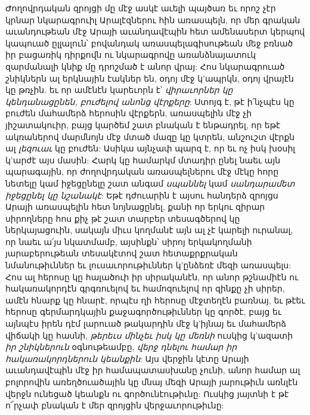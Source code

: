 \documentclass{article}
\begin{document}
{Ժողովրդական զրոյցի մը մէջ ասկէ աւելի պայծառ եւ որոշ չէր կրնար նկարագրուիլ Արալէզներու հին առասպելն, որ մեր գրական աւանդութեան մէջ Արայի աւանդավէպին հետ ամենասերտ կերպով կապուած ըլլալուն՝ բովանդակ առասպելագիսութեան մեջ բռնած իր բացառիկ դիրքովն ու նկարագրովը առանձնայատուկ զարմանալի կնիք մը դրոշմած է անոր վրայ: Հոս նկարագրուած շնիկներն ալ երկնային էակներ են, օդոյ մէջ կ'ապրկն, օդոյ վրայէն կը թռչին. եւ որ ամէնէն կարեւորն է՝ \emph{վիրաւորներ կը կենդանացընեն, բուժելով անոնց վէրքերը}: Ստոյգ է, թէ ի՛նչպէս կը բուժեն մահամերձ հերոսին վէրքերն, առասպելին մէջ չի յիշատակուիր, բայց կարծեմ շատ բնական է ենթադրել, որ եթէ ակռաներով մարմնոյն մէջ մտած մազը կը կտրեն, անշուշտ վէրքն ալ \emph{լեզուաւ} կը բուժեն: Ասիկա այնչափ պարզ է, որ եւ ոչ իսկ խօսիլ կ'արժէ այս մասին: Հարկ կը համարկմ մտադիր ընել նաեւ այն պարագային, որ ժողովրդական առասպելներու մէջ մէկը հորը նետելը կամ իջեցընելը շատ անգամ \emph{սպաննել} կամ \emph{սանդարամետ իջեցընել կը նշանակէ}: Եթէ դժուարին է այսու հանդերձ զրոյցս Արայի առասպելին հետ նոյնացընել, քանի որ երկու զիրար սիրողները հոս քիչ թէ շատ տարբեր տեսագծերով կը ներկայացուին, սակայն միւս կողմանէ այն ալ չէ կարելի ուրանալ, որ նաեւ ա՛յս նկատմամբ, այսինքն՝ սիրոյ երկակողմանի յարաբերութեան տեսակէտով շատ հետաքրքրական նմանութիւններ եւ լուսաւորութիւններ կ'ընձեռէ մեզի առասպելս: Հոս ալ հերոսը կը հալածուի իր սիրականէն, որ անոր թշնամիէն ու հակառակորդէն գրգռուելով եւ համոզուելով որ զինքը չի սիրեր, ամէն հնարք կը հնարէ, որպէս ղի հերոսը մէջտեղէն բառնայ, եւ թէեւ հերոսը գերմարդկային քաջագործութիւններ կը գործէ, բայց եւ այնպէս իրեն դէմ լարուած թակարդին մէջ կ'իյնայ եւ մահամերձ վիճակի կը հասնի, \emph{թերեւս մինչեւ իսկ կը մեռնի} ուսկից կ'ազատի \emph{իր շնիկներուն} օգնութեամբը, \emph{վերջ դնելու համար իր հակառակորդներուն կեանքին}: Այս վերջին կէտը Արայի աւանդավէպին մէջ իր համապատասխանը չունի, անոր համար ալ բոլորովին առեղծուածային կը մնայ մեզի Արայի յարութիւն առնլէն վերջն ունեցած կեանքն ու գործունէութիւնը: Ուսկից յայտնի է թէ ո՜րչափ բնական է մեր զրոյցին վերջաւորութիւնը:

}
\end{document}
